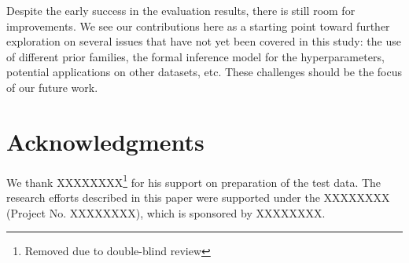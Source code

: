 Despite the early success in the evaluation results, there is still room for
improvements.  We see our contributions here as a starting point toward further
exploration on several issues that have not yet been covered in this study: the
use of different prior families, the formal inference model for the
hyperparameters, potential applications on other datasets, etc.  These
challenges should be the focus of our future work.


\section*{Acknowledgments}

We thank XXXXXXXX\footnote{Removed due to double-blind review} for his
support on preparation of the test data.  The research efforts described in
this paper were supported under the XXXXXXXX (Project No. XXXXXXXX), which is
sponsored by XXXXXXXX.

